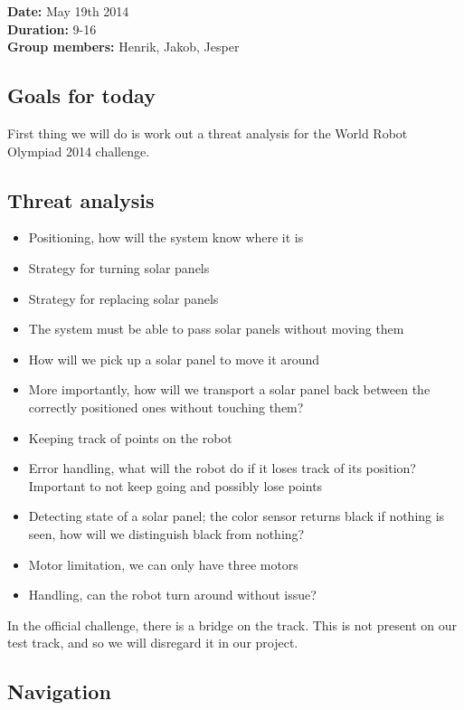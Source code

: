 \textbf{Date:} May 19th 2014\\\textbf{Duration:} 9-16\\\textbf{Group
members:} Henrik, Jakob, Jesper

\subsection{Goals for today}

First thing we will do is work out a threat analysis for the World Robot
Olympiad 2014 challenge.

\subsection{Threat analysis}

\begin{itemize}
\itemsep1pt\parskip0pt
\item
  Positioning, how will the system know where it is
\item
  Strategy for turning solar panels
\item
  Strategy for replacing solar panels
\item
  The system must be able to pass solar panels without moving them
\item
  How will we pick up a solar panel to move it around
\item
  More importantly, how will we transport a solar panel back between the
  correctly positioned ones without touching them?
\item
  Keeping track of points on the robot
\item
  Error handling, what will the robot do if it loses track of its
  position? Important to not keep going and possibly lose points
\item
  Detecting state of a solar panel; the color sensor returns black if
  nothing is seen, how will we distinguish black from nothing?
\item
  Motor limitation, we can only have three motors
\item
  Handling, can the robot turn around without issue?
\end{itemize}

In the official challenge, there is a bridge on the track. This is not
present on our test track, and so we will disregard it in our project.

\subsection{Navigation}

